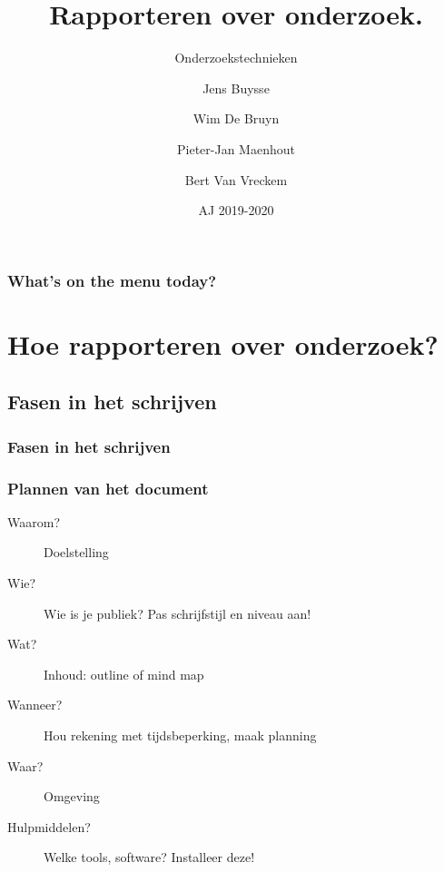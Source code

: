 \documentclass[aspectratio=169]{beamer}
\title{Rapporteren over onderzoek.}
\subtitle{Onderzoekstechnieken}
\author{Jens Buysse \and Wim {De Bruyn} \and Pieter-Jan Maenhout \and Bert {Van Vreckem}}
\date{AJ 2019-2020}
\begin{document}
\begin{frame}
  \maketitle
\end{frame}

\begin{frame}
  \frametitle{What's on the menu today?}
  
  \tableofcontents
\end{frame}


\section{Hoe rapporteren over onderzoek?}

\subsection{Fasen in het schrijven}

\begin{frame}
  \frametitle{Fasen in het schrijven}
  \centering
\end{frame}

\begin{frame}
  \frametitle{Plannen van het document}
  
  \begin{description}
    \item[Waarom?] Doelstelling
    \item[Wie?] Wie is je publiek? Pas schrijfstijl en niveau aan!
    \item[Wat?] Inhoud: outline of mind map
    \item[Wanneer?] Hou rekening met tijdsbeperking, maak planning
    \item[Waar?] Omgeving
    \item[Hulpmiddelen?] Welke tools, software? Installeer deze!
  \end{description}
\end{frame}
\end{document}
